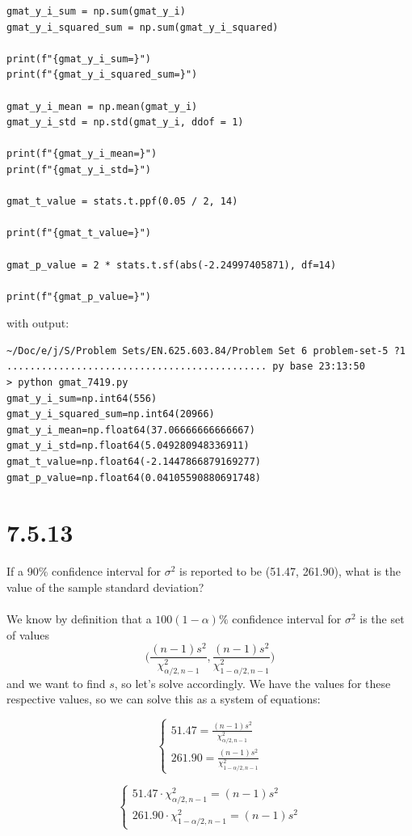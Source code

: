 \documentclass{article}
\begin{document}
{\begin{verbatim}
gmat_y_i_sum = np.sum(gmat_y_i)
gmat_y_i_squared_sum = np.sum(gmat_y_i_squared)

print(f"{gmat_y_i_sum=}")
print(f"{gmat_y_i_squared_sum=}")

gmat_y_i_mean = np.mean(gmat_y_i)
gmat_y_i_std = np.std(gmat_y_i, ddof = 1)

print(f"{gmat_y_i_mean=}")
print(f"{gmat_y_i_std=}")

gmat_t_value = stats.t.ppf(0.05 / 2, 14)

print(f"{gmat_t_value=}")

gmat_p_value = 2 * stats.t.sf(abs(-2.24997405871), df=14)

print(f"{gmat_p_value=}")
\end{verbatim}
with output:
\begin{verbatim}
~/Doc/e/j/S/Problem Sets/EN.625.603.84/Problem Set 6 problem-set-5 ?1 ............................................. py base 23:13:50
> python gmat_7419.py
gmat_y_i_sum=np.int64(556)
gmat_y_i_squared_sum=np.int64(20966)
gmat_y_i_mean=np.float64(37.06666666666667)
gmat_y_i_std=np.float64(5.049280948336911)
gmat_t_value=np.float64(-2.1447866879169277)
gmat_p_value=np.float64(0.04105590880691748)
\end{verbatim}

\section*{7.5.13}

If a 90\% confidence interval for \(\sigma^2\) is reported to be (51.47, 261.90), what is the value of the sample standard deviation?
\\
\\
We know by definition that a \(100(1 - \alpha) \%\) confidence interval for \(\sigma^2\) is the set of values 
\[
\big(\frac{(n-1)s^2}{\chi^2_{\alpha / 2, n-1}}, \frac{(n-1)s^2}{\chi^2_{1 - \alpha / 2, n-1}}\big)
\]
and we want to find \(s\), so let's solve accordingly. We have the values for these respective values, so we can solve this as a system of equations:

\begin{equation*}
\begin{cases}
51.47 = \frac{(n-1)s^2}{\chi^2_{\alpha / 2, n-1}} \\
261.90 = \frac{(n-1)s^2}{\chi^2_{1 - \alpha / 2, n-1}}
\end{cases}
\end{equation*}

\begin{equation*}
\begin{cases}
51.47 \cdot \chi^2_{\alpha / 2, n-1} = (n-1)s^2 \\
261.90 \cdot \chi^2_{1 - \alpha / 2, n-1} = (n-1)s^2
\end{cases}
\end{equation*}

}
\end{document}
